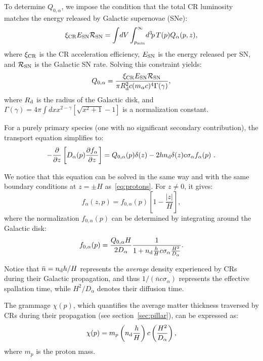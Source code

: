 To determine \(Q_{0,\alpha}\), we impose the condition that the total CR luminosity matches the energy released by Galactic supernovae (SNe):  
\begin{equation}
\xi_{\rm CR} E_{\rm SN} \mathcal{R}_{\rm SN} = \int \! dV \int_{p_{\rm min}}^\infty \! d^3 \! p \, T(p) Q_\alpha(p, z),
\end{equation}
where \(\xi_{\rm CR}\) is the CR acceleration efficiency, \(E_{\rm SN}\) is the energy released per SN, and \(\mathcal{R}_{\rm SN}\) is the Galactic SN rate. Solving this constraint yields:  
\begin{equation}
Q_{0,\alpha} = \frac{\xi_{\rm CR} E_{\rm SN} \mathcal{R}_{\rm SN}}{\pi R_{\rm d}^2 c (m_\alpha c)^4 \Gamma(\gamma)},
\end{equation}
where \(R_{\rm d}\) is the radius of the Galactic disk, and \(\Gamma(\gamma) = 4\pi \int dx x^{2-\gamma} \left[ \sqrt{x^2 + 1} - 1 \right] \) is a normalization constant.

For a purely primary species (one with no significant secondary contribution), the transport equation simplifies to:  
\begin{equation}
-\frac{\partial}{\partial z} \left[ D_\alpha(p) \frac{\partial f_\alpha}{\partial z} \right] = Q_{0,\alpha}(p)\delta(z) - 2 h n_{\rm d} \delta (z) c \sigma_\alpha f_\alpha(p)~.
\end{equation}

We notice that this equation can be solved in the same way and with the same boundary conditions at $z = \pm H$ as~\cref{eq:protons}. 
%
For $z \neq 0$, it gives:
\begin{equation}
f_\alpha(z, p) = f_{0,\alpha}(p) \left[ 1 - \frac{|z|}{H} \right],
\end{equation}
where the normalization \(f_{0,\alpha}(p)\) can be determined by integrating around the Galactic disk:  
\begin{equation}
f_{0,\alpha}(p) = \frac{Q_{0,\alpha} H}{2D_\alpha} \frac{1}{1 + n_{\rm d} \frac{h}{H} c \sigma_\alpha \frac{H^2}{D_\alpha}}.
\end{equation}

Notice that $\bar n = n_{\rm d} h/H$ represents the \emph{average} density experienced by CRs during their Galactic propagation, and thus $1/(\bar n c \sigma_\alpha)$ represents the effective spallation time, while $H^2/D_\alpha$ denotes their diffusion time.

The grammage \(\chi(p)\), which quantifies the average matter thickness traversed by CRs during their propagation (see section~\ref{sec:pillar}), can be expressed as:  
\begin{equation}
\chi(p) = m_p \left( n_{\rm d} \frac{h}{H} \right) c \left( \frac{H^2}{D_\alpha} \right),
\end{equation}
where \(m_p\) is the proton mass. 

